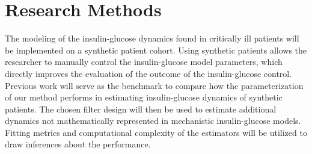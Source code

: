 \documentclass[nomenclature, english, bibtex]{kththesis}
\newcommand*{\generalExpl}[1]{\todo[inline]{#1}}
\newcommand*{\sweExpl}[1]{\todo[inline, backgroundcolor=kth-lightblue40]{#1}}  %
\begin{document}

\section{Research Methods}

The modeling of the insulin-glucose dynamics found in critically ill patients will be implemented on a synthetic patient cohort. Using synthetic patients allows the researcher to manually control the insulin-glucose model parameters, which directly improves the evaluation of the outcome of the insulin-glucose control. Previous work will serve as the benchmark to compare how the parameterization of our method performs in estimating insulin-glucose dynamics of synthetic patients. The chosen filter design will then be used to estimate additional dynamics not mathematically represented in mechanistic insulin-glucose models. Fitting metrics and computational complexity of the estimators will be utilized to draw inferences about the performance.
\end{document}
